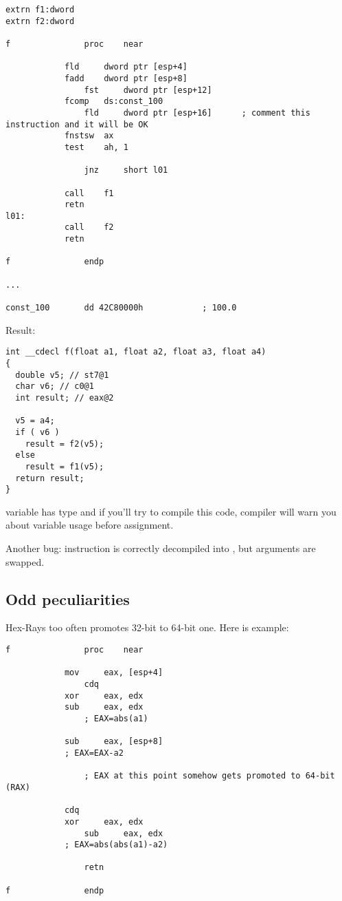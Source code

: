 \begin{lstlisting}
extrn f1:dword
extrn f2:dword

f               proc    near

	        fld     dword ptr [esp+4]
        	fadd    dword ptr [esp+8]
                fst     dword ptr [esp+12]
	        fcomp   ds:const_100
                fld     dword ptr [esp+16]      ; comment this instruction and it will be OK
	        fnstsw  ax
        	test    ah, 1

                jnz     short l01

	        call    f1
        	retn
l01:
	        call    f2
        	retn

f               endp

...

const_100       dd 42C80000h            ; 100.0
\end{lstlisting}

Result:

\begin{lstlisting}
int __cdecl f(float a1, float a2, float a3, float a4)
{
  double v5; // st7@1
  char v6; // c0@1
  int result; // eax@2

  v5 = a4;
  if ( v6 )
    result = f2(v5);
  else
    result = f1(v5);
  return result;
}
\end{lstlisting}

 variable has  type and if you'll try to compile this code, compiler will warn you about variable
usage before assignment.

Another bug:  instruction is correctly decompiled into , but arguments are swapped.

\subsection{Odd peculiarities}

Hex-Rays too often promotes 32-bit  to 64-bit one.
Here is example:

\begin{lstlisting}
f               proc    near

	        mov     eax, [esp+4]
                cdq
	        xor     eax, edx
        	sub     eax, edx
                ; EAX=abs(a1)

	        sub     eax, [esp+8]
        	; EAX=EAX-a2

                ; EAX at this point somehow gets promoted to 64-bit (RAX)

	        cdq
        	xor     eax, edx
                sub     eax, edx
	        ; EAX=abs(abs(a1)-a2)

                retn

f               endp
\end{lstlisting}

